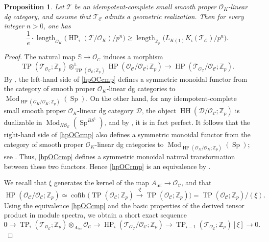 \documentclass[11pt]{amsart}
\newtheorem{prop}[lemma]{Proposition}
\numberwithin{equation}{section}
\renewcommand{\L}{\mathbb{L}}
\newcommand{\Z}{\mathbb{Z}}
\newcommand{\sC}{\mathcal{C}}
\newcommand{\sD}{\mathcal{D}}
\newcommand{\sO}{\mathcal{O}}
\newcommand{\sT}{\mathcal{T}}
\newcommand{\len}{\operatorname{length}}
\newcommand{\Mod}{\operatorname{Mod}}
\newcommand{\cofib}{\operatorname{cofib}}
\newcommand{\Sp}{\operatorname{Sp}}
\numberwithin{equation}{section}
\newcommand{\Ainf}{A_{\operatorname{inf}}}
\newcommand{\HH}{\operatorname{HH}}
\newcommand{\TP}{\operatorname{TP}}
\newcommand{\HP}{\operatorname{HP}}
\newcommand{\bS}{\mathbb{S}}
\newcommand{\LK}{{L_{K(1)}}}
\begin{document}
\begin{prop}\label{hplength}
Let $\sT$ be an idempotent-complete small smooth proper $\sO_K$-linear dg category, and assume that $\sT_\sC$ admits a geometric realization. Then for every integer $n>0$, one has
\[
\frac{1}{e}\cdot \len_{\sO_K}\bigl(\HP_i(\sT/\sO_K)/p^n\bigr)
\geq
\len_{\Z_p}\bigl(\LK K_i(\sT_\sC)/p^n\bigr).
\]
\end{prop}

\begin{proof}
The natural map $\bS \to \sO_\sC$ induces a morphism
\begin{equation}\label{hpOCcmp}
\TP(\sT_{\sO_\sC};\Z_p)\otimes^{\L}_{\TP(\sO_\sC;\Z_p)} \HP(\sO_\sC/\sO_\sC;\Z_p)
\longrightarrow
\HP(\sT_{\sO_\sC}/\sO_\sC;\Z_p).
\end{equation}
By \cite[Proposition 2.12]{M26}, the left-hand side of \eqref{hpOCcmp} defines a symmetric monoidal functor from the category of smooth proper $\sO_K$-linear dg categories to $\Mod_{\HP(\sO_K/\sO_K;\Z_p)}(\Sp)$. On the other hand, for any idempotent-complete small smooth proper $\sO_K$-linear dg category $\sD$, the object $\HH(\sD/\sO_\sC;\Z_p)$ is dualizable in $\Mod_{H\sO_\sC}(\Sp^{BS^1})$, and by \cite[Theorem 2.15]{AMN18}, it is in fact perfect. It follows that the right-hand side of \eqref{hpOCcmp} also defines a symmetric monoidal functor from the category of smooth proper $\sO_K$-linear dg categories to $\Mod_{\HP(\sO_K/\sO_K;\Z_p)}(\Sp)$; see \cite{AMN18}. Thus, \eqref{hpOCcmp} defines a symmetric monoidal natural transformation between these two functors. Hence \eqref{hpOCcmp} is an equivalence by \cite[Proposition 4.6]{AMN18}.

We recall that $\xi$ generates the kernel of the map $\Ainf \to \sO_\sC$, and that
\[
\HP(\sO_\sC/\sO_\sC;\Z_p)
\simeq
\cofib\bigl(\TP(\sO_\sC;\Z_p)\xrightarrow{\cdot \xi}\TP(\sO_\sC;\Z_p)\bigr)
=
\TP(\sO_\sC;\Z_p)/(\xi).
\]
Using the equivalence \eqref{hpOCcmp} and the basic properties of the derived tensor product in module spectra, we obtain a short exact sequence
\begin{equation}\label{hpseq}
0
\to
\TP_i(\sT_{\sO_\sC};\Z_p)\otimes_{\Ainf}\sO_\sC
\to
\HP_i(\sT_{\sO_\sC}/\sO_\sC;\Z_p)
\to
\TP_{i-1}(\sT_{\sO_\sC};\Z_p)[\xi]
\to
0.
\end{equation}


\end{proof}
\end{document}
